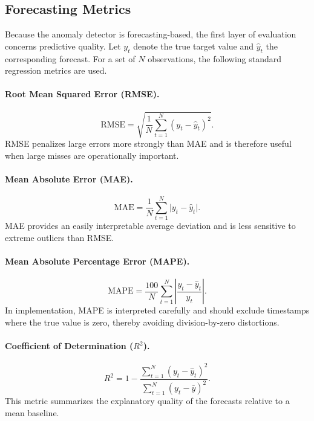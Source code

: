 \subsection{Forecasting Metrics}

Because the anomaly detector is forecasting-based, the first layer of evaluation concerns predictive quality. Let $y_t$ denote the true target value and $\hat{y}_t$ the corresponding forecast. For a set of $N$ observations, the following standard regression metrics are used.

\paragraph{Root Mean Squared Error (RMSE).}
\begin{equation}
	\mathrm{RMSE} =
	\sqrt{
		\frac{1}{N}\sum_{t=1}^{N}(y_t - \hat{y}_t)^2
	}.
	\label{eq:rmse_ch54}
\end{equation}
RMSE penalizes large errors more strongly than MAE and is therefore useful when large misses are operationally important.

\paragraph{Mean Absolute Error (MAE).}
\begin{equation}
	\mathrm{MAE} =
	\frac{1}{N}\sum_{t=1}^{N}\lvert y_t - \hat{y}_t \rvert.
	\label{eq:mae_ch54}
\end{equation}
MAE provides an easily interpretable average deviation and is less sensitive to extreme outliers than RMSE.

\paragraph{Mean Absolute Percentage Error (MAPE).}
\begin{equation}
	\mathrm{MAPE} =
	\frac{100}{N}\sum_{t=1}^{N}
	\left|
	\frac{y_t - \hat{y}_t}{y_t}
	\right|.
	\label{eq:mape_ch54}
\end{equation}
In implementation, MAPE is interpreted carefully and should exclude timestamps where the true value is zero, thereby avoiding division-by-zero distortions.

\paragraph{Coefficient of Determination ($R^2$).}
\begin{equation}
	R^2 =
	1 -
	\frac{\sum_{t=1}^{N}(y_t - \hat{y}_t)^2}
	{\sum_{t=1}^{N}(y_t - \bar{y})^2}.
	\label{eq:r2_ch54}
\end{equation}
This metric summarizes the explanatory quality of the forecasts relative to a mean baseline.

